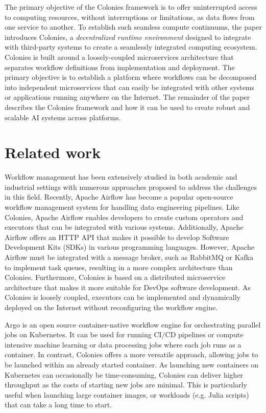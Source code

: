 \documentclass{article}
\begin{document}
The primary objective of the Colonies framework is to offer uninterrupted access to computing resources, without interruptions or limitations, as data flows from one service to another. To establish such seamless compute continuums, the paper introduces Colonies, a \emph{decentralized runtime environment} designed to integrate with third-party systems to create a seamlessly integrated computing ecosystem. Colonies is built around a loosely-coupled microservices architecture that separates workflow definitions from implementation and deployment. The primary objective is to establish a platform where workflows can be decomposed into independent microservices that can easily be integrated with other systems or applications running anywhere on the Internet. The remainder of the paper describes the Colonies framework and how it can be used to create robust and scalable AI systems across platforms. 

\section{Related work}
Workflow management has been extensively studied in both academic and industrial settings with numerous approaches \cite{scafe, synapse, service_wfs, schmitt2022workflow, GarciaRepresa1740746, Ouyang2010, NIKOLOV2021100440, workflow_in_bigdata} proposed to address the challenges in this field. Recently, Apache Airflow \cite{apache_airflow} has become a popular open-source workflow management system for handling data engineering pipelines. Like Colonies, Apache Airflow enables developers to create custom operators and executors that can be integrated with various systems. Additionally, Apache Airflow offers an HTTP API that makes it possible to develop Software Development Kits (SDKs) in various programming languages. However, Apache Airflow must be integrated with a message broker, such as RabbitMQ \cite{rabbitmq} or Kafka \cite{apache_kafka} to implement task queues, resulting in a more complex architecture than Colonies. Furthermore, Colonies is based on a distributed microservice architecture that makes it more suitable for DevOps software development. As Colonies is loosely coupled, executors can be implemented and dynamically deployed on the Internet without reconfiguring the workflow engine.

Argo \cite{argowf} is an open source container-native workflow engine for orchestrating parallel jobs on Kubernetes. It can be used for running CI/CD pipelines or compute intensive machine learning or data processing jobs where each job runs as a container. In contrast, Colonies offers a more versatile approach, allowing jobs to be launched within an already started container. As launching new containers on Kubernetes can occasionally be time-consuming, Colonies can deliver higher throughput as the costs of starting new jobs are minimal. This is particularly useful when launching large container images, or workloads (e.g. Julia scripts) that can take a long time to start. 
\end{document}
